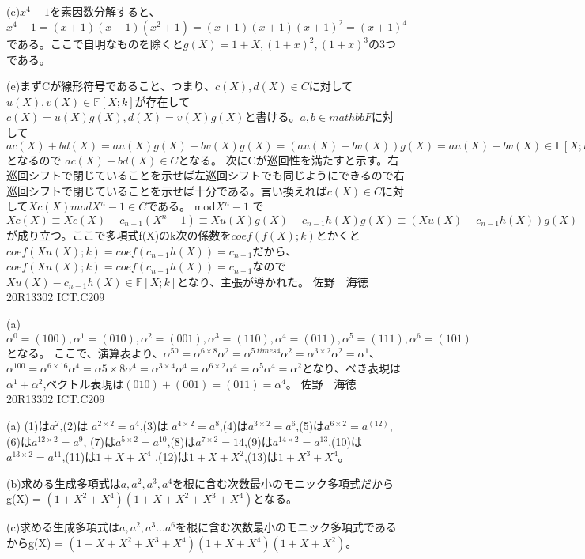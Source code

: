 \documentclass[11pt]{jsarticle}
\begin{document}
\par(c)$x^4 - 1$を素因数分解すると、$x^4 - 1 = (x+ 1)(x - 1)(x^2 + 1) = (x + 1)(x + 1)(x + 1)^2 = (x + 1)^4$である。ここで自明なものを除くと$g(X) = 1 + X,(1 + x)^2,(1 + x)^3$の3つである。
\par(e)まずCが線形符号であること、つまり、$c(X),d(X) \in C$に対して$u(X),v(X) \in \mathbb{F}[X;k]$が存在して$c(X) = u(X)g(X),d(X) = v(X)g(X)$と書ける。$a,b \in mathbb{F}$に対して$ac(X) + bd(X) = au(X)g(X) + bv(X)g(X) = (au(X) + bv(X))g(X) = au(X) + bv(X) \in \mathbb{F}[X;k]$となるので
$ac(X) + bd(X) \in C$となる。
次にCが巡回性を満たすと示す。右巡回シフトで閉じていることを示せば左巡回シフトでも同じようにできるので右巡回シフトで閉じていることを示せば十分である。言い換えれば$c(X) \in C$に対して$Xc(X) mod X^n - 1 \in C$である。
mod$X^n- 1$ で$Xc(X) \equiv Xc(X) - c_{n - 1}(X^n - 1) \equiv Xu(X)g(X) - c_{n - 1}h(X)g(X) \equiv (Xu(X) - c_{n - 1}h(X))g(X)$が成り立つ。ここで多項式f(X)のk次の係数を$coef(f(X);k)$とかくと$coef(Xu(X);k) = coef(c_{n - 1}h(X)) = c_{n - 1}$だから、
$coef(Xu(X);k) = coef(c_{n - 1}h(X)) = c_{n - 1}$なので$Xu(X) - c_{n - 1}h(X) \in \mathbb{F}[X;k]$となり、主張が導かれた。\newpage
佐野　海徳 20R13302 ICT.C209\\
\par(a)$\alpha^0 = (100),\alpha^1 = (010), \alpha^2 = (001), \alpha^3 = (110), \alpha^4 = (011), \alpha^5 = (111), \alpha^6 = (101)$となる。
ここで、演算表より、$\alpha^{50} = \alpha^{6 \times 8} \alpha^2  =\alpha^{5 \ times 4} \alpha^2 = \alpha^{3\times 2} \alpha^2 = \alpha^1$、$\alpha^{100} = \alpha^{6 \times 16} \alpha^4 = \alpha{5 \times 8} \alpha^4 = \alpha^{3 \times 4} \alpha^4
 = \alpha^{6 \times 2} \alpha^4 = \alpha^{5} \alpha^4 = \alpha^2$となり、べき表現は$\alpha^1 + \alpha^2$,ベクトル表現は$(010) + (001) = (011) = \alpha^4$。
\newpage
佐野　海徳 20R13302 ICT.C209\\
\par (a) (1)は$a^2$,(2)は $ a^{2\times 2} = a^4$,(3)は $a^{4 \times 2} = a^8$,(4)は$a^{3 \times 2} = a^6$,(5)は$a^{6 \times 2} = a^(12)$,(6)は$a^{12 \times 2} = a^9$,
(7)は$a^{5 \times 2} = a^10$,(8)は$a^{7 \times 2} = 14$,(9)は$a^{14 \times 2} = a^13$,(10)は$a^{13\times 2} = a^11$,(11)は$1 + X + X^4$
,(12)は$1 + X + X^2$,(13)は$1 + X^3 + X^4$。
\par (b)求める生成多項式は$a,a^2,a^3,a^4$を根に含む次数最小のモニック多項式だからg(X) = $(1 + X^2 + X^4)(1 + X + X^2 + X^3 + X^4)$となる。
\par (c)求める生成多項式は$a,a^2,a^3...a^6$を根に含む次数最小のモニック多項式であるからg(X) = $(1 + X + X^2 + X^3 + X^4)(1 + X + X^4)(1 + X + X^2)$。\newpage
\end{document}
